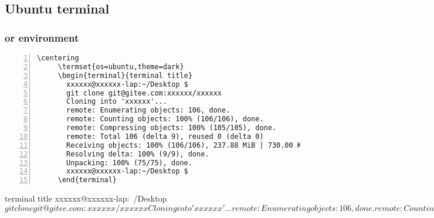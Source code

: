 \documentclass{ctxdoc}
\begin{document}
 \subsection{Ubuntu terminal}

 \subsubsection{ or  environment}

   \begin{Verbatim}[frame=none,numbers=left,gobble=5]
     \centering
     \termset{os=ubuntu,theme=dark}
     \begin{terminal}{terminal title}
       xxxxxx@xxxxxx-lap:~/Desktop $
       git clone git@gitee.com:xxxxxx/xxxxxx
       Cloning into 'xxxxxx'...
       remote: Enumerating objects: 106, done.
       remote: Counting objects: 100% (106/106), done.
       remote: Compressing objects: 100% (105/105), done.
       remote: Total 106 (delta 9), reused 0 (delta 0)
       Receiving objects: 100% (106/106), 237.88 MiB | 730.00 KiB/s, done.
       Resolving delta: 100% (9/9), done.
       Unpacking: 100% (75/75), done.
       xxxxxx@xxxxxx-lap:~/Desktop $
     \end{terminal}
   \end{Verbatim}

\begin{center}
\begin{minipage}{0.85\textwidth}
\begin{terminal}{terminal title}
  xxxxxx@xxxxxx-lap:~/Desktop $
  git clone git@gitee.com:xxxxxx/xxxxxx
  Cloning into 'xxxxxx'...
  remote: Enumerating objects: 106, done.
  remote: Counting objects: 100%
  remote: Compressing objects: 100%
  remote: Total 106 (delta 9), reused 0 (delta 0)
  Receiving objects: 100%
  Resolving delta: 100%
  Unpacking: 100%
  xxxxxx@xxxxxx-lap:~/Desktop $
\end{terminal}
\end{minipage}
\end{center}
\end{document}
